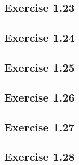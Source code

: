 \documentclass[../A&M.tex]{subfiles}
\begin{document}
\subsection*{Exercise 1.23}

\subsection*{Exercise 1.24}

\subsection*{Exercise 1.25}

\subsection*{Exercise 1.26}

\subsection*{Exercise 1.27}

\subsection*{Exercise 1.28}
\phantom{}
\end{document}
